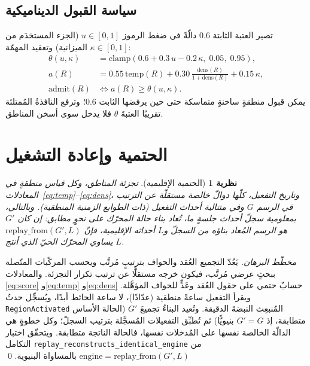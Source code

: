 \documentclass[11pt]{article}
\newtheorem{theorem}{نظرية}
\newcommand{\code}[1]{\textenglish{\texttt{#1}}}
\begin{document}
\subsection{سياسة القبول الديناميكية}\label{sec:policy}

تصير العتبة الثابتة $0.6$ دالّةً في ضغط الرموز $u\in[0,1]$ (الجزء المستخدَم من الميزانية)
وتعقيد المهمّة $\kappa\in[0,1]$:
\begin{align}
\theta(u,\kappa)       &= \mathrm{clamp}(0.6 + 0.3\,u - 0.2\,\kappa,\; 0.05,\; 0.95), \\
a(R)                   &= 0.55\,\mathrm{temp}(R) + 0.30\,\frac{\mathrm{dens}(R)}{1+\mathrm{dens}(R)} + 0.15\,\kappa, \\
\mathrm{admit}(R)      &\iff a(R) \ge \theta(u,\kappa).
\end{align}
يمكن قبول منطقةٍ ساخنةٍ متماسكة حتى حين يرفضها الثابت $0.6$؛ وترفع النافذةُ المُمتلئة تقريبًا
العتبةَ $\theta$ فلا يدخل سوى أسخن المناطق.

\section{الحتمية وإعادة التشغيل}\label{sec:determinism}

\begin{theorem}[الحتمية الإقليمية]
تجزئة المناطق، وكل قياس منطقةٍ في المعادلات~\eqref{eq:temp}--\eqref{eq:dens}، وتاريخ
التفعيل، كلّها دوالّ خالصة مستقلّة عن الترتيب في الرسم $G$ وفي متتالية أحداث التفعيل (ذات
الطوابع الزمنية المنطقية). وبالتالي، بمعلومية سجلّ أحداث جلسةٍ ما، تُعاد بناء حالة المحرّك
على نحوٍ مطابق: إن كان $G'$ هو الرسم المُعاد بناؤه من السجلّ و$L$ أحداثه الإقليمية، فإنّ
$\mathrm{replay\_from}(G',L)$ يساوي المحرّك الحيّ الذي أنتج $L$.
\end{theorem}
\begin{proof}[مخطّط البرهان]
يَعُدّ التجميع العُقد والحواف بترتيبٍ مُرتَّب ويحسب المركّبات المتّصلة ببحثٍ عرضي مُرتَّب،
فيكون خرجه مستقلًّا عن ترتيب تكرار التجزئة. والمعادلات \eqref{eq:score} و\eqref{eq:temp}
و\eqref{eq:dens} حسابٌ حتمي على حقول العُقد وعَدٍّ للحواف المؤهَّلة. ويقرأ التفعيل ساعةً
منطقية (عدّادًا)، لا ساعة الحائط أبدًا، ويُسجِّل حدثُ \code{RegionActivated} المُنبعِث
النبضةَ الدقيقة. وتُعيد البناءُ تجميعَ $G'$ (الحالة الأساس متطابقة، إذ $G'\!=\!G$ بنيويًّا)
ثم تُطبِّق التفعيلات المُسجَّلة بترتيب السجلّ؛ وكل خطوةٍ هي الدالّة الخالصة نفسها على المُدخلات
نفسها، فالحالة الناتجة متطابقة. ويتحقّق اختبار التكامل
\code{replay\_reconstructs\_identical\_engine} من $\mathrm{engine}=\mathrm{replay\_from}(G',L)$
بالمساواة البنيوية. \qed
\end{proof}
\end{document}
